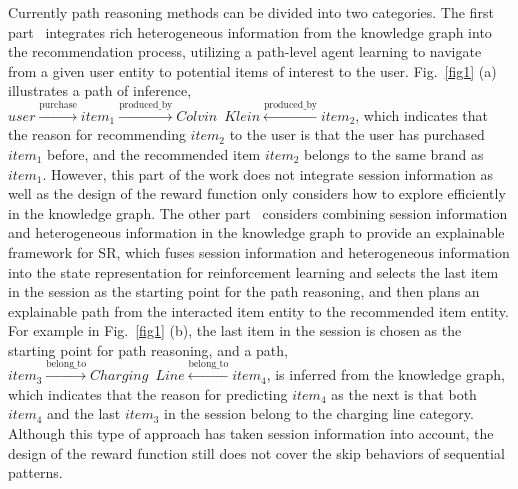\documentclass[10pt,journal,compsoc]{IEEEtran}
\begin{document}
Currently path reasoning methods can be divided into two categories. 
The first part~\cite{rl_pgpr,rl_multi} integrates rich heterogeneous information from the knowledge graph into the recommendation process, utilizing a path-level agent learning to navigate from a given user entity to potential items of interest to the user. Fig.~\ref{fig1} (a) illustrates a path of inference, $ user\xrightarrow{\text{purchase}} item_1 \xrightarrow{\text{produced\_by}} Colvin \enspace Klein \xleftarrow{\text{produced\_by}} item_2 $, which indicates that the reason for recommending $item_2$ to the user is that the user has purchased $item_1$ before, and the recommended item $item_2$ belongs to the same brand as $item_1$. However, this part of the work does not integrate session information as well as the design of the reward function only considers how to explore efficiently in the knowledge graph. 
The other part~\cite{rs_reks} considers combining session information and heterogeneous information in the knowledge graph to provide an explainable framework for SR, which fuses session information and heterogeneous information into the state representation for reinforcement learning and selects the last item in the session as the starting point for the path reasoning, and then plans an explainable path from the interacted item entity to the recommended item entity. For example in Fig.~\ref{fig1} (b), the last item in the session is chosen as the starting point for path reasoning, and a path, $ item_3 \xrightarrow{\text{belong\_to}} Charging \enspace Line \xleftarrow{\text{belong\_to}} item_4 $, is inferred from the knowledge graph, which indicates that the reason for predicting $item_4$ as the next is that both $item_4$ and the last $item_3$ in the session belong to the charging line category. Although this type of approach has taken session information into account, the design of the reward function still does not cover the skip behaviors of sequential patterns.
\end{document}
